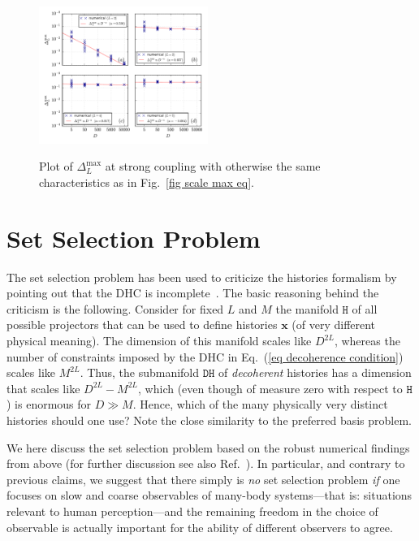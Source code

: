 \documentclass[pre,twocolumn,10pt,aps,longbibliography,nofootinbib]{revtex4-1}
\newcommand{\bb}[1]{\textbf{#1}}
\newcommand{\blue}[1]{#1}
\begin{document}
\begin{figure}[t]
 \centering\includegraphics[width=0.49\textwidth,clip=true]{Max_1_eq.pdf}
 \label{fig scale max eq fast}\vspace{-0.5cm}
 \caption{Plot of $\Delta_L^\text{max}$ at strong coupling with otherwise the same characteristics as in Fig.~\ref{fig scale max eq}. }
\end{figure}

\section{\blue{Set Selection Problem}}
\label{sec consequences}


The set selection problem has been used to criticize the histories formalism by pointing out that the DHC is incomplete~\cite{PazZurekPRD1993, DowkerKentPRL1995, DowkerKentJSP1996, KentPS1998, ZurekRMP2003, RiedelZurekZwolakPRA2016, SchlosshauerPR2019, ZurekEnt2022}. The basic reasoning behind the criticism is the following. Consider for fixed $L$ and $M$ the manifold $\texttt{H}$ of all possible projectors that can be used to define histories $\bb x$ (of very different physical meaning). The dimension of this manifold scales like $D^{2L}$, whereas the number of constraints imposed by the DHC in Eq.~(\ref{eq decoherence condition}) scales like $M^{2L}$. Thus, the submanifold $\texttt{DH}$ of \emph{decoherent} histories has a dimension that scales like $D^{2L} - M^{2L}$, which (even though of measure zero with respect to $\texttt{H}$) is enormous for $D\gg M$. Hence, which of the many physically very distinct histories should one use? Note the close similarity to the preferred basis problem.

\blue{We here discuss the set selection problem based on the robust numerical findings from above (for further discussion see also Ref.~\cite{Griffiths2019}). In particular, and contrary to previous claims, we suggest that there simply is} \emph{no} set selection problem \emph{if} one focuses on slow and coarse observables of many-body systems---that is: situations relevant to human perception---and the remaining \blue{freedom in the choice of observable} is actually important \blue{for the ability of different observers to agree}.
\end{document}
